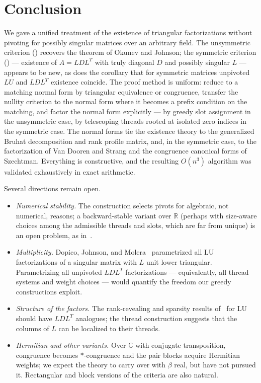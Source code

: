 \section{Conclusion}\label{sec:conclusion}

We gave a unified treatment of the existence of triangular factorizations
without pivoting for possibly singular matrices over an arbitrary field.
The unsymmetric criterion () recovers the theorem of Okunev
and Johnson; the symmetric criterion () --- existence of
$A = LDL^T$ with truly diagonal $D$ and possibly singular $L$ --- appears
to be new, as does the corollary that for symmetric matrices unpivoted
$LU$ and $LDL^T$ existence coincide.  The proof method is uniform: reduce
to a matching normal form by triangular equivalence or congruence,
transfer the nullity criterion to the normal form where it becomes a
prefix condition on the matching, and factor the normal form explicitly
--- by greedy slot assignment in the unsymmetric case, by telescoping
threads rooted at isolated zero indices in the symmetric case.  The
normal forms tie the existence theory to the generalized Bruhat
decomposition and rank profile matrix, and, in the symmetric case, to the
factorization of Van Dooren and Strang and the congruence canonical forms
of Szechtman.  Everything is constructive, and the resulting $O(n^3)$
algorithm was validated exhaustively in exact arithmetic.

Several directions remain open.
\begin{itemize}
  \item \emph{Numerical stability.}  The construction selects pivots for
    algebraic, not numerical, reasons; a backward-stable variant over
    $\mathbb{R}$ (perhaps with size-aware choices among the admissible
    threads and slots, which are far from unique) is an open problem, as
    in~\cite{darve_lu_2026}.
  \item \emph{Multiplicity.}  Dopico, Johnson, and
    Molera~\cite{dopico_multiple_2006} parametrized all LU factorizations
    of a singular matrix with $L$ unit lower triangular.  Parametrizing
    all unpivoted $LDL^T$ factorizations --- equivalently, all thread
    systems and weight choices --- would quantify the freedom our greedy
    constructions exploit.
  \item \emph{Structure of the factors.}  The rank-revealing and sparsity
    results of~\cite{darve_lu_2026} for LU should have $LDL^T$ analogues;
    the thread construction suggests that the columns of $L$ can be
    localized to their threads.
  \item \emph{Hermitian and other variants.}  Over $\mathbb{C}$ with
    conjugate transposition, congruence becomes $\ast$-congruence and the
    pair blocks acquire Hermitian weights; we expect the theory to carry
    over with $\beta$ real, but have not pursued it.  Rectangular and
    block versions of the criteria are also natural.
\end{itemize}
